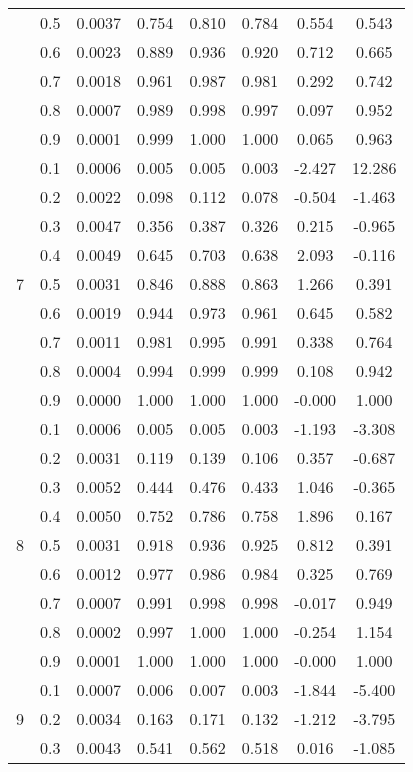 \documentclass[11pt,a4paper]{report}
\begin{document}
\begin{longtable}{ | c | c || c | c | c | c | c | c | }
 & 0.5 & 0.0037 & 0.754 & 0.810 & 0.784 & 0.554 & 0.543 \\
 & 0.6 & 0.0023 & 0.889 & 0.936 & 0.920 & 0.712 & 0.665 \\
 & 0.7 & 0.0018 & 0.961 & 0.987 & 0.981 & 0.292 & 0.742 \\
 & 0.8 & 0.0007 & 0.989 & 0.998 & 0.997 & 0.097 & 0.952 \\
 & 0.9 & 0.0001 & 0.999 & 1.000 & 1.000 & 0.065 & 0.963 \\
 \hline
\multirow{9}{*}{7} & 0.1 & 0.0006 & 0.005 & 0.005 & 0.003 & -2.427 & 12.286 \\
 & 0.2 & 0.0022 & 0.098 & 0.112 & 0.078 & -0.504 & -1.463 \\
 & 0.3 & 0.0047 & 0.356 & 0.387 & 0.326 & 0.215 & -0.965 \\
 & 0.4 & 0.0049 & 0.645 & 0.703 & 0.638 & 2.093 & -0.116 \\
 & 0.5 & 0.0031 & 0.846 & 0.888 & 0.863 & 1.266 & 0.391 \\
 & 0.6 & 0.0019 & 0.944 & 0.973 & 0.961 & 0.645 & 0.582 \\
 & 0.7 & 0.0011 & 0.981 & 0.995 & 0.991 & 0.338 & 0.764 \\
 & 0.8 & 0.0004 & 0.994 & 0.999 & 0.999 & 0.108 & 0.942 \\
 & 0.9 & 0.0000 & 1.000 & 1.000 & 1.000 & -0.000 & 1.000 \\
 \hline
\multirow{9}{*}{8} & 0.1 & 0.0006 & 0.005 & 0.005 & 0.003 & -1.193 & -3.308 \\
 & 0.2 & 0.0031 & 0.119 & 0.139 & 0.106 & 0.357 & -0.687 \\
 & 0.3 & 0.0052 & 0.444 & 0.476 & 0.433 & 1.046 & -0.365 \\
 & 0.4 & 0.0050 & 0.752 & 0.786 & 0.758 & 1.896 & 0.167 \\
 & 0.5 & 0.0031 & 0.918 & 0.936 & 0.925 & 0.812 & 0.391 \\
 & 0.6 & 0.0012 & 0.977 & 0.986 & 0.984 & 0.325 & 0.769 \\
 & 0.7 & 0.0007 & 0.991 & 0.998 & 0.998 & -0.017 & 0.949 \\
 & 0.8 & 0.0002 & 0.997 & 1.000 & 1.000 & -0.254 & 1.154 \\
 & 0.9 & 0.0001 & 1.000 & 1.000 & 1.000 & -0.000 & 1.000 \\
 \hline
\multirow{9}{*}{9} & 0.1 & 0.0007 & 0.006 & 0.007 & 0.003 & -1.844 & -5.400 \\
 & 0.2 & 0.0034 & 0.163 & 0.171 & 0.132 & -1.212 & -3.795 \\
 & 0.3 & 0.0043 & 0.541 & 0.562 & 0.518 & 0.016 & -1.085 \\

\end{longtable}
\end{document}
